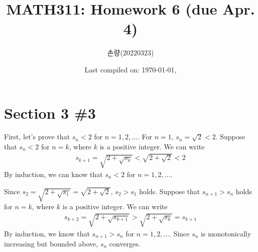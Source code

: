 \documentclass{scrartcl}
\title{MATH311: Homework 6 (due Apr. 4)}
\author{손량(20220323)}
\date{Last compiled on: \today, \currenttime}
\begin{document}
\maketitle

\section{Section 3 \#3}
First, let's prove that \(s_n < 2\) for \(n = 1, 2, \dots\).
For \(n = 1\), \(s_n = \sqrt{2} < 2\).
Suppose that \(s_n < 2\) for \(n = k\), where \(k\) is a positive integer.
We can write
\begin{align*}
  s_{k + 1} = \sqrt{2 + \sqrt{s_k}} < \sqrt{2 + \sqrt{2}} < 2
\end{align*}
By induction, we can know that \(s_n < 2\) for \(n = 1, 2, \dots\).

Since \(s_2 = \sqrt{2 + \sqrt{s_1}} = \sqrt{2 + \sqrt{2}}\), \(s_2 > s_1\) holds.
Suppose that \(s_{n + 1} > s_n\) holds for \(n = k\), where \(k\) is a positive integer.
We can write
\begin{align*}
  s_{k + 2} = \sqrt{2 + \sqrt{s_{k + 1}}} > \sqrt{2 + \sqrt{s_k}} = s_{k + 1}
\end{align*}
By induction, we know that \(s_{n + 1} > s_n\) for \(n = 1, 2, \dots\).
Since \(s_n\) is monotonically increasing but bounded above, \(s_n\) converges.
\end{document}
